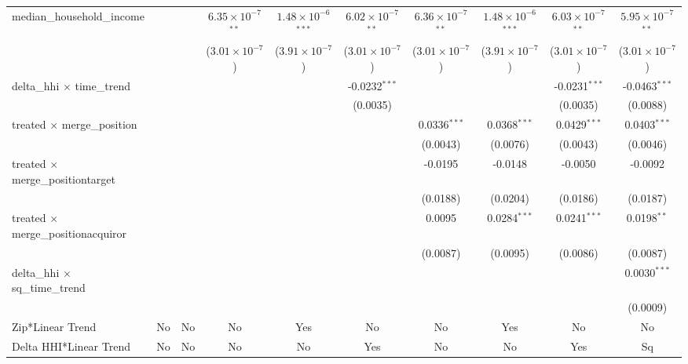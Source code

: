 \begin{table}[H]
{\begin{tabular}{lccccccccc}
 median\_household\_income&   &    & $6.35\times 10^{-7}$$^{**}$ & $1.48\times 10^{-6}$$^{***}$ & $6.02\times 10^{-7}$$^{**}$ & $6.36\times 10^{-7}$$^{**}$ & $1.48\times 10^{-6}$$^{***}$ & $6.03\times 10^{-7}$$^{**}$ & $5.95\times 10^{-7}$$^{**}$\\ 

   &   &    & ($3.01\times 10^{-7}$) & ($3.91\times 10^{-7}$) & ($3.01\times 10^{-7}$) & ($3.01\times 10^{-7}$) & ($3.91\times 10^{-7}$) & ($3.01\times 10^{-7}$) & ($3.01\times 10^{-7}$)\\ 

 delta\_hhi $\times $ time\_trend&   &    &    &    & -0.0232$^{***}$ &    &    & -0.0231$^{***}$ & -0.0463$^{***}$\\ 

   &   &    &    &    & (0.0035) &    &    & (0.0035) & (0.0088)\\ 

 treated $\times $ merge\_position&   &    &    &    &    & 0.0336$^{***}$ & 0.0368$^{***}$ & 0.0429$^{***}$ & 0.0403$^{***}$\\ 

   &   &    &    &    &    & (0.0043) & (0.0076) & (0.0043) & (0.0046)\\ 

 treated $\times $ merge\_positiontarget&   &    &    &    &    & -0.0195 & -0.0148 & -0.0050 & -0.0092\\ 

   &   &    &    &    &    & (0.0188) & (0.0204) & (0.0186) & (0.0187)\\ 

 treated $\times $ merge\_positionacquiror&   &    &    &    &    & 0.0095 & 0.0284$^{***}$ & 0.0241$^{***}$ & 0.0198$^{**}$\\ 

   &   &    &    &    &    & (0.0087) & (0.0095) & (0.0086) & (0.0087)\\ 

 delta\_hhi $\times $ sq\_time\_trend&   &    &    &    &    &    &    &    & 0.0030$^{***}$\\ 

   &   &    &    &    &    &    &    &    & (0.0009)\\ 

 Zip*Linear Trend & No & No & No & Yes & No & No & Yes & No & No\\ 

 Delta HHI*Linear Trend & No & No & No & No & Yes & No & No & Yes & Sq\\ 


\end{tabular}}
\end{table}
